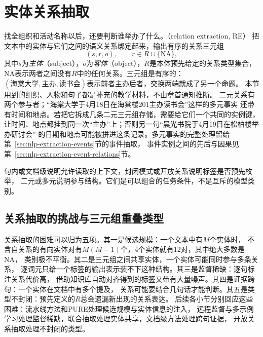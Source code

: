 \section{实体关系抽取}
\label{sec:nlp-extraction-relations}

找全组织和活动名称以后，还要判断谁举办了什么。（relation extraction, RE）
把文本中的实体与它们之间的语义关系绑定起来，输出有序的关系三元组
\[
  (s,r,o),\qquad r\in R\cup\{\mathrm{NA}\},
\]
其中$s$为\emph{主体}（subject），$o$为\emph{客体}（object），$R$是本体预先给定的关系类型集合，
$\mathrm{NA}$表示两者之间没有$R$中的任何关系。三元组是有序的：
$(\text{海棠大学},\text{主办},\text{读书会})$表示前者主办后者，交换两端就成了另一个命题。
本节用到的组织、人物和句子都是补充的教学材料，不由章首通知推断。
二元关系有两个参与者；“海棠大学于4月18日在海棠楼201主办读书会”这样的多元事实
还带有时间和地点。若把它拆成几条二元三元组存储，需要给它们一个共同的实例键，
让时间、地点都挂到同一次“主办”上；否则另一句“晨光书院于4月19日在松柏楼举办研讨会”
的日期和地点可能被拼进这条记录。多元事实的完整处理留给第~\ref{sec:nlp-extraction-events}节的事件抽取，
事件实例之间的先后与因果见第~\ref{sec:nlp-extraction-event-relations}节。

句内或文档级说明允许读取的上下文，封闭模式或开放关系说明标签是否预先枚举，
二元或多元说明参与结构。它们是可以组合的任务条件，不是互斥的模型类别。

\subsection{关系抽取的挑战与三元组重叠类型}
\label{sec:nlp-extraction-relation-challenges}

关系抽取的困难可以归为五项。其一是候选规模：一个文本中有$M$个实体时，
不含自关系的有向实体对有$M(M-1)$个，4个实体就有12对，其中绝大多数是NA，
类别极不平衡。其二是三元组之间共享实体，一个实体可能同时参与多条关系，
逐词元只给一个标签的输出表示装不下这种结构。其三是监督稀缺：逐句标注关系代价高，
借助知识库自动对齐得到的标签又带有大量噪声。其四是证据跨句：一个实体在文档中有多个提及，
关系可能要结合几句话才能判断。其五是类型不封闭：预先定义的$R$总会遗漏新出现的关系表达。
后续各小节分别回应这些困难：流水线方法和PURE处理候选规模与实体信息的注入，
远程监督与多示例学习处理监督稀缺，联合抽取处理实体共享，文档级方法处理跨句证据，
开放关系抽取处理不封闭的类型。

